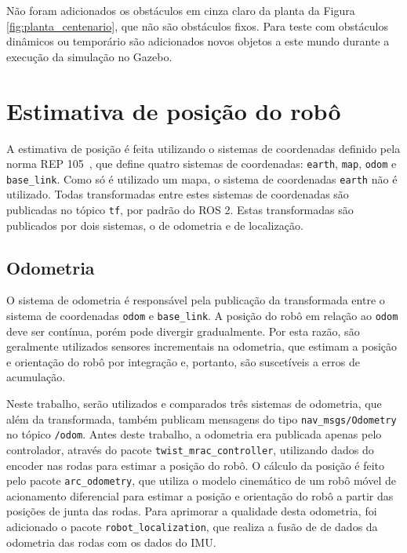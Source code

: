 \documentclass[repeatfields,xlists,xpacks,oneside,yearsonly]{ufrgscca}
\begin{document}
Não foram adicionados os obstáculos em cinza claro da planta da
Figura \ref{fig:planta_centenario}, que não são obstáculos fixos.
Para teste com obstáculos dinâmicos ou temporário são adicionados
novos objetos a este mundo durante a execução da simulação no Gazebo.

\section{Estimativa de posição do robô}

A estimativa de posição é feita utilizando o sistemas de coordenadas
definido pela norma REP 105~\cite{rep_105}, que define quatro
sistemas de coordenadas: \texttt{earth}, \texttt{map}, \texttt{odom}
e \texttt{base\_link}. Como só é utilizado um mapa, o sistema de
coordenadas \texttt{earth} não é utilizado. Todas transformadas entre
estes sistemas de coordenadas são publicadas no tópico \texttt{tf},
por padrão do ROS 2. Estas transformadas são publicados por dois
sistemas, o de odometria e de localização.

\subsection{Odometria}
\label{met:odometria}

O sistema de odometria é responsável pela publicação da transformada
entre o sistema de coordenadas \texttt{odom} e \texttt{base\_link}. A
posição do robô em relação ao \texttt{odom} deve ser contínua, porém
pode divergir gradualmente. Por esta razão, são geralmente utilizados
sensores incrementais na odometria, que estimam a posição e
orientação do robô por integração e, portanto, são suscetíveis a
erros de acumulação. 

Neste trabalho, serão utilizados e comparados três sistemas de
odometria, que além da transformada, também publicam mensagens do
tipo \texttt{nav\_msgs/Odometry} no tópico \texttt{/odom}. Antes
deste trabalho, a odometria era publicada apenas pelo controlador,
através do pacote \texttt{twist\_mrac\_controller}, utilizando dados
do encoder nas rodas para estimar a posição do robô. O cálculo da
posição é feito pelo pacote \texttt{arc\_odometry}, que utiliza o
modelo cinemático de um robô móvel de acionamento diferencial para
estimar a posição e orientação do robô a partir das posições de junta
das rodas. Para aprimorar a qualidade desta odometria, foi adicionado
o pacote \texttt{robot\_localization}, que realiza a fusão de de
dados da odometria das rodas com os dados do IMU.
\end{document}
